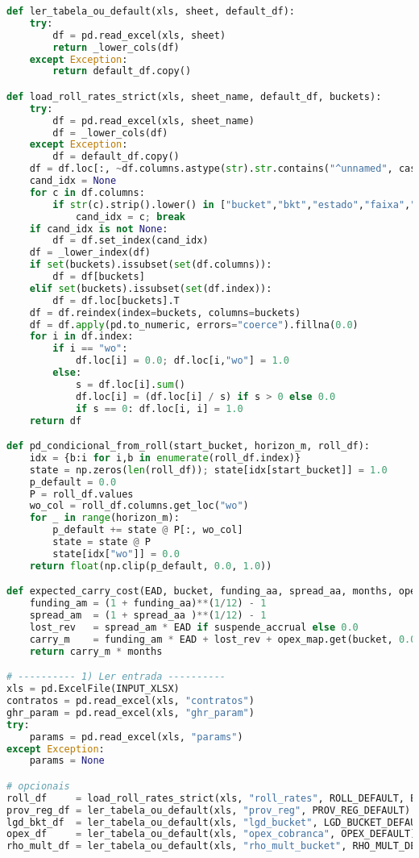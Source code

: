 \documentclass[11pt,a4paper]{article}
\newcommand{\1}{\mathbf{1}}
\begin{document}
\begin{lstlisting}[language=Python, caption={risk_frontier.py}]
def ler_tabela_ou_default(xls, sheet, default_df):
    try:
        df = pd.read_excel(xls, sheet)
        return _lower_cols(df)
    except Exception:
        return default_df.copy()

def load_roll_rates_strict(xls, sheet_name, default_df, buckets):
    try:
        df = pd.read_excel(xls, sheet_name)
        df = _lower_cols(df)
    except Exception:
        df = default_df.copy()
    df = df.loc[:, ~df.columns.astype(str).str.contains("^unnamed", case=False, regex=True)]
    cand_idx = None
    for c in df.columns:
        if str(c).strip().lower() in ["bucket","bkt","estado","faixa","bucket_atraso"]:
            cand_idx = c; break
    if cand_idx is not None:
        df = df.set_index(cand_idx)
    df = _lower_index(df)
    if set(buckets).issubset(set(df.columns)):
        df = df[buckets]
    elif set(buckets).issubset(set(df.index)):
        df = df.loc[buckets].T
    df = df.reindex(index=buckets, columns=buckets)
    df = df.apply(pd.to_numeric, errors="coerce").fillna(0.0)
    for i in df.index:
        if i == "wo":
            df.loc[i] = 0.0; df.loc[i,"wo"] = 1.0
        else:
            s = df.loc[i].sum()
            df.loc[i] = (df.loc[i] / s) if s > 0 else 0.0
            if s == 0: df.loc[i, i] = 1.0
    return df

def pd_condicional_from_roll(start_bucket, horizon_m, roll_df):
    idx = {b:i for i,b in enumerate(roll_df.index)}
    state = np.zeros(len(roll_df)); state[idx[start_bucket]] = 1.0
    p_default = 0.0
    P = roll_df.values
    wo_col = roll_df.columns.get_loc("wo")
    for _ in range(horizon_m):
        p_default += state @ P[:, wo_col]
        state = state @ P
        state[idx["wo"]] = 0.0
    return float(np.clip(p_default, 0.0, 1.0))

def expected_carry_cost(EAD, bucket, funding_aa, spread_aa, months, opex_map, suspende_accrual=True):
    funding_am = (1 + funding_aa)**(1/12) - 1
    spread_am  = (1 + spread_aa )**(1/12) - 1
    lost_rev   = spread_am * EAD if suspende_accrual else 0.0
    carry_m    = funding_am * EAD + lost_rev + opex_map.get(bucket, 0.0)
    return carry_m * months

# ---------- 1) Ler entrada ----------
xls = pd.ExcelFile(INPUT_XLSX)
contratos = pd.read_excel(xls, "contratos")
ghr_param = pd.read_excel(xls, "ghr_param")
try:
    params = pd.read_excel(xls, "params")
except Exception:
    params = None

# opcionais
roll_df     = load_roll_rates_strict(xls, "roll_rates", ROLL_DEFAULT, BUCKETS)
prov_reg_df = ler_tabela_ou_default(xls, "prov_reg", PROV_REG_DEFAULT)
lgd_bkt_df  = ler_tabela_ou_default(xls, "lgd_bucket", LGD_BUCKET_DEFAULT)
opex_df     = ler_tabela_ou_default(xls, "opex_cobranca", OPEX_DEFAULT)
rho_mult_df = ler_tabela_ou_default(xls, "rho_mult_bucket", RHO_MULT_DEFAULT)


\end{lstlisting}
\end{document}
